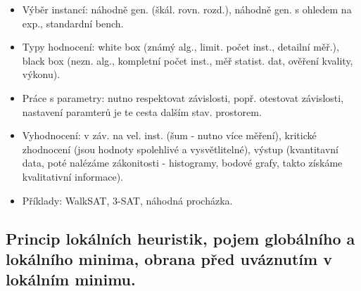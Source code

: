 \documentclass[a4paper,hidelinks]{article}
\begin{document}
\begin{itemize}
\begin{itemize}
\begin{itemize}
            \item Výběr instancí: náhodně gen. (škál. rovn. rozd.), náhodně gen. s ohledem na exp., standardní bench.
            \item Typy hodnocení: white box (známý alg., limit. počet inst., detailní měř.), black box (nezn. alg., kompletní počet inst., měř statist. dat, ověření kvality, výkonu).
            \item Práce s parametry: nutno respektovat závislosti, popř. otestovat závislosti, nastavení paramterů je te cesta dalším stav. prostorem.
            \item Vyhodnocení: v záv. na vel. inst. (šum - nutno více měření), kritické zhodnocení (jsou hodnoty spolehlivé a vysvětlitelné), výstup (kvantitavní data, poté nalézáme zákonitosti - histogramy, bodové grafy, takto získáme kvalitativní informace).
            \item Příklady: WalkSAT, 3-SAT, náhodná procházka.
        \end{itemize}
     \end{itemize}
\end{itemize}


\subsection{Princip lokálních heuristik, pojem globálního a lokálního minima, obrana před uváznutím v lokálním minimu.}
\end{document}
